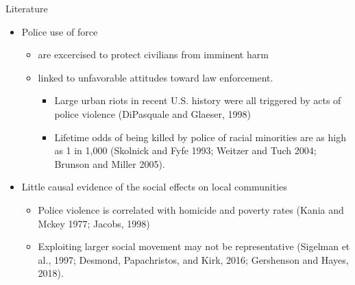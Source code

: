 \documentclass[dvipdfmx]{beamer}
\begin{document}
\begin{frame}{Literature}
  \begin{itemize}
    \item Police use of force
    \begin{itemize}
      \item are excercised to protect civilians from imminent harm
      \item linked to unfavorable attitudes toward law enforcement.
      \begin{itemize}
        \item Large urban riots in recent U.S. history were all triggered by acts of police violence (DiPasquale and Glaeser, 1998)
        \item Lifetime odds of being killed by police of racial minorities are as high as 1 in 1,000 (Skolnick and Fyfe 1993; Weitzer and Tuch 2004; Brunson and Miller 2005).
      \end{itemize}
    \end{itemize}
    \item Little causal evidence of the social effects on local communities
    \begin{itemize}
      \item Police violence is correlated with homicide and poverty rates (Kania and Mckey 1977; Jacobs, 1998)
      \item Exploiting larger social movement may not be representative (Sigelman et al., 1997; Desmond, Papachristos, and Kirk, 2016; Gershenson and Hayes, 2018).
    \end{itemize}
  \end{itemize}
\end{frame}
\end{document}
